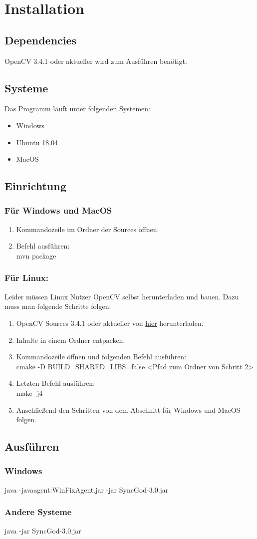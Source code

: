 \newpage
\chapter{Installation}
\section{Dependencies}
OpenCV 3.4.1 oder aktueller wird zum Ausführen benötigt.

\section{Systeme}
Das Programm läuft unter folgenden Systemen:
\begin{itemize}
\item Windows
\item Ubuntu 18.04
\item MacOS
\end{itemize}  

\section{Einrichtung}
\subsection{Für Windows und MacOS}
\begin{enumerate}
	\item Kommandozeile im Ordner der Sources öffnen.
	\item Befehl ausführen: \\ mvn package
\end{enumerate}
\subsection{Für Linux:}
Leider müssen Linux Nutzer OpenCV selbst herunterladen und bauen. Dazu muss man folgende Schritte folgen: \\
\begin{enumerate}
	\item OpenCV Sources 3.4.1 oder aktueller von \href{https://opencv.org/releases.html}{hier}  herunterladen.
	\item Inhalte in einem Ordner entpacken.
	\item Kommandozeile öffnen und folgenden Befehl ausführen:\\ cmake -D BUILD\_SHARED\_LIBS=false <Pfad zum Ordner von Schritt 2>
	\item Letzten Befehl ausführen:\\ make -j4
	\item Anschließend den Schritten von dem Abschnitt für Windows und MacOS folgen.
\end{enumerate}

\section{Ausführen}
\subsection{Windows}
java -javaagent:WinFixAgent.jar -jar SyncGod-3.0.jar
\subsection{Andere Systeme}
java -jar SyncGod-3.0.jar

